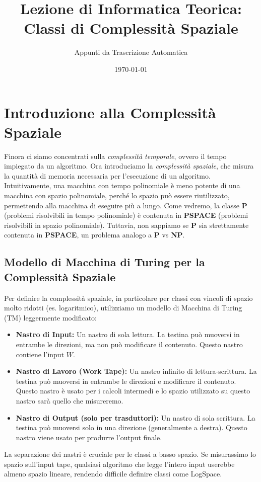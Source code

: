 \documentclass[a4paper]{article}
\title{Lezione di Informatica Teorica: Classi di Complessità Spaziale}
\author{Appunti da Trascrizione Automatica}
\date{\today}
\theoremstyle{definition} %
\begin{document}
\maketitle
\tableofcontents
\newpage

\section{Introduzione alla Complessità Spaziale}

Finora ci siamo concentrati sulla \emph{complessità temporale}, ovvero il tempo impiegato da un algoritmo. Ora introduciamo la \emph{complessità spaziale}, che misura la quantità di memoria necessaria per l'esecuzione di un algoritmo.
Intuitivamente, una macchina con tempo polinomiale è meno potente di una macchina con spazio polinomiale, perché lo spazio può essere riutilizzato, permettendo alla macchina di eseguire più a lungo.
Come vedremo, la classe \textbf{P} (problemi risolvibili in tempo polinomiale) è contenuta in \textbf{PSPACE} (problemi risolvibili in spazio polinomiale). Tuttavia, non sappiamo se \textbf{P} sia strettamente contenuta in \textbf{PSPACE}, un problema analogo a \textbf{P} vs \textbf{NP}.

\subsection{Modello di Macchina di Turing per la Complessità Spaziale}

Per definire la complessità spaziale, in particolare per classi con vincoli di spazio molto ridotti (es. logaritmico), utilizziamo un modello di Macchina di Turing (TM) leggermente modificato:
\begin{itemize}
    \item \textbf{Nastro di Input:} Un nastro di sola lettura. La testina può muoversi in entrambe le direzioni, ma non può modificare il contenuto. Questo nastro contiene l'input $W$.
    \item \textbf{Nastro di Lavoro (Work Tape):} Un nastro infinito di lettura-scrittura. La testina può muoversi in entrambe le direzioni e modificare il contenuto. Questo nastro è usato per i calcoli intermedi e lo spazio utilizzato su questo nastro sarà quello che misureremo.
    \item \textbf{Nastro di Output (solo per trasduttori):} Un nastro di sola scrittura. La testina può muoversi solo in una direzione (generalmente a destra). Questo nastro viene usato per produrre l'output finale.
\end{itemize}
La separazione dei nastri è cruciale per le classi a basso spazio. Se misurassimo lo spazio sull'input tape, qualsiasi algoritmo che legge l'intero input userebbe almeno spazio lineare, rendendo difficile definire classi come LogSpace.
\end{document}
